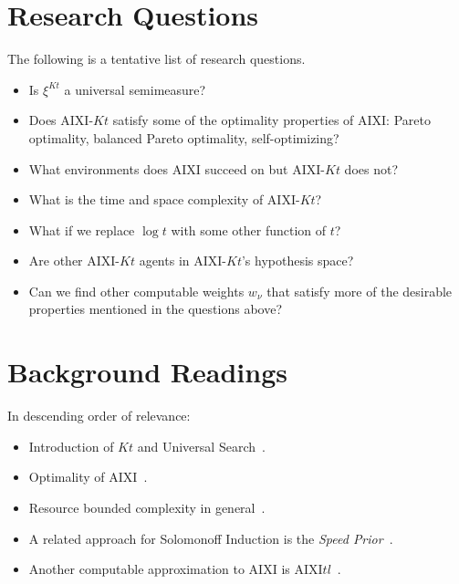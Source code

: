 \documentclass[a4paper]{article}
\begin{document}
\section{Research Questions}

The following is a tentative list of research questions.
\begin{itemize}
\item Is $\xi^{Kt}$ a universal semimeasure? %
\item Does AIXI-$Kt$ satisfy some of the optimality properties of AIXI:
	Pareto optimality, balanced Pareto optimality, self-optimizing?
\item What environments does AIXI succeed on but AIXI-$Kt$ does not?
\item What is the time and space complexity of AIXI-$Kt$?
\item What if we replace $\log t$ with some other function of $t$?
\item Are other AIXI-$Kt$ agents in AIXI-$Kt$'s hypothesis space?
\item Can we find other computable weights $w_\nu$
	that satisfy more of the desirable properties
	mentioned in the questions above?
\end{itemize}


\section{Background Readings}

In descending order of relevance:
\begin{itemize}
\item Introduction of $Kt$ and Universal Search~\cite[Ch.\ 7.5]{LV:2008}.
\item Optimality of AIXI~\cite[Ch.\ 5.4]{Hutter:2005}.
\item Resource bounded complexity in general~\cite[Ch.\ 7.1]{LV:2008}.
\item A related approach for Solomonoff Induction is
	the \emph{Speed Prior}~\cite{Schmidhuber:2002}.
\item Another computable approximation to AIXI is AIXI$tl$~\cite[Ch.\ 7.2]{Hutter:2005}.
\end{itemize}





\end{document}

